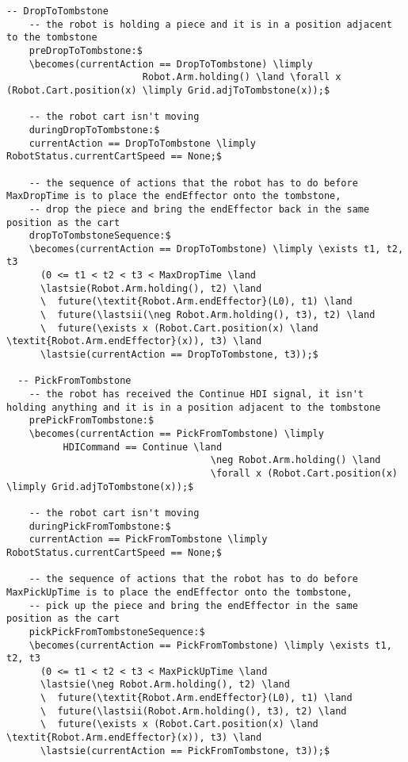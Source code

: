 \begin{lstlisting}[fontadjust, mathescape, frame=single]
  -- DropToTombstone
    -- the robot is holding a piece and it is in a position adjacent to the tombstone
    preDropToTombstone:$
    \becomes(currentAction == DropToTombstone) \limply
                        Robot.Arm.holding() \land \forall x (Robot.Cart.position(x) \limply Grid.adjToTombstone(x));$

    -- the robot cart isn't moving
    duringDropToTombstone:$
    currentAction == DropToTombstone \limply RobotStatus.currentCartSpeed == None;$

    -- the sequence of actions that the robot has to do before MaxDropTime is to place the endEffector onto the tombstone,
    -- drop the piece and bring the endEffector back in the same position as the cart
    dropToTombstoneSequence:$
    \becomes(currentAction == DropToTombstone) \limply \exists t1, t2, t3
      (0 <= t1 < t2 < t3 < MaxDropTime \land
      \lastsie(Robot.Arm.holding(), t2) \land
      \  future(\textit{Robot.Arm.endEffector}(L0), t1) \land
      \  future(\lastsii(\neg Robot.Arm.holding(), t3), t2) \land
      \  future(\exists x (Robot.Cart.position(x) \land \textit{Robot.Arm.endEffector}(x)), t3) \land
      \lastsie(currentAction == DropToTombstone, t3));$

  -- PickFromTombstone
    -- the robot has received the Continue HDI signal, it isn't holding anything and it is in a position adjacent to the tombstone
    prePickFromTombstone:$
    \becomes(currentAction == PickFromTombstone) \limply
          HDICommand == Continue \land
                                    \neg Robot.Arm.holding() \land
                                    \forall x (Robot.Cart.position(x) \limply Grid.adjToTombstone(x));$

    -- the robot cart isn't moving
    duringPickFromTombstone:$
    currentAction == PickFromTombstone \limply RobotStatus.currentCartSpeed == None;$

    -- the sequence of actions that the robot has to do before MaxPickUpTime is to place the endEffector onto the tombstone,
    -- pick up the piece and bring the endEffector in the same position as the cart
    pickPickFromTombstoneSequence:$
    \becomes(currentAction == PickFromTombstone) \limply \exists t1, t2, t3
      (0 <= t1 < t2 < t3 < MaxPickUpTime \land
      \lastsie(\neg Robot.Arm.holding(), t2) \land
      \  future(\textit{Robot.Arm.endEffector}(L0), t1) \land
      \  future(\lastsii(Robot.Arm.holding(), t3), t2) \land
      \  future(\exists x (Robot.Cart.position(x) \land \textit{Robot.Arm.endEffector}(x)), t3) \land
      \lastsie(currentAction == PickFromTombstone, t3));$
    

\end{lstlisting}
